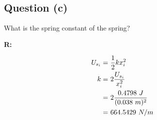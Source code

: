 	\subsection{Question (c)}

		What is the spring constant of the spring?

		\textbf{R:}

		\begin{align}
			U_{s_{i}} = \ &\frac{1}{2}kx_{i}^{2}& \notag \\
			k = \ &2 \frac{U_{s_{i}}}{x_{i}^{2}}& \notag \\
			= \ &2 \frac{0.4798 \ J}{(0.038 \ m)^{2}}& \notag \\
			= \ &664.5429 \ N/m&
		\end{align}
